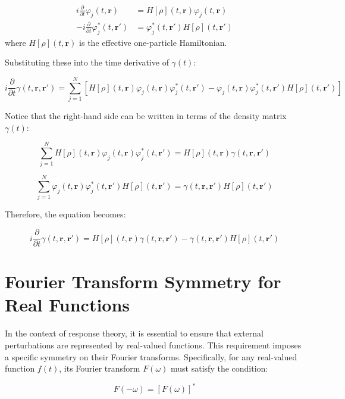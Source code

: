 \begin{align}
i \frac{\partial}{\partial t} \varphi_{j}(t, \mathbf{r}) &= H[\rho](t, \mathbf{r}) \varphi_{j}(t, \mathbf{r}) \\
-i \frac{\partial}{\partial t} \varphi_{j}^{*}(t, \mathbf{r}') &= \varphi_{j}^{*}(t, \mathbf{r}') H[\rho](t, \mathbf{r}') 
\end{align}
where \( H[\rho](t, \mathbf{r}) \) is the effective one-particle Hamiltonian.

Substituting these into the time derivative of \( \gamma(t) \):

\[
i \frac{\partial}{\partial t} \gamma(t, \mathbf{r}, \mathbf{r}') = \sum_{j=1}^{N} \left[ H[\rho](t, \mathbf{r}) \varphi_{j}(t, \mathbf{r}) \varphi_{j}^{*}(t, \mathbf{r}') - \varphi_{j}(t, \mathbf{r}) \varphi_{j}^{*}(t, \mathbf{r}') H[\rho](t, \mathbf{r}') \right]
\]

Notice that the right-hand side can be written in terms of the density matrix \( \gamma(t) \):

\[
\sum_{j=1}^{N} H[\rho](t, \mathbf{r}) \varphi_{j}(t, \mathbf{r}) \varphi_{j}^{*}(t, \mathbf{r}') = H[\rho](t, \mathbf{r}) \gamma(t, \mathbf{r}, \mathbf{r}')
\]

\[
\sum_{j=1}^{N} \varphi_{j}(t, \mathbf{r}) \varphi_{j}^{*}(t, \mathbf{r}') H[\rho](t, \mathbf{r}') = \gamma(t, \mathbf{r}, \mathbf{r}') H[\rho](t, \mathbf{r}')
\]

Therefore, the equation becomes:

\[
i \frac{\partial}{\partial t} \gamma(t, \mathbf{r}, \mathbf{r}') = H[\rho](t, \mathbf{r}) \gamma(t, \mathbf{r}, \mathbf{r}') - \gamma(t, \mathbf{r}, \mathbf{r}') H[\rho](t, \mathbf{r}')
\]

\section{Fourier Transform Symmetry for Real Functions}
\label{sec:FourierTransformSymmetry}

In the context of response theory, it is essential to ensure that external perturbations are represented by real-valued functions. This requirement imposes a specific symmetry on their Fourier transforms. Specifically, for any real-valued function \( f(t) \), its Fourier transform \( F(\omega) \) must satisfy the condition:

\begin{equation}
F(-\omega) = [F(\omega)]^* \label{eq:FourierSymmetry}
\end{equation}

